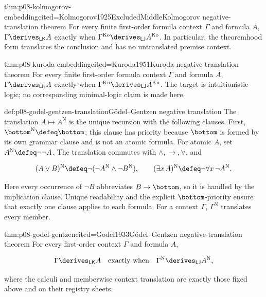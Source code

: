 \begin{hbtheorem}{thm:p08-kolmogorov-embedding}{cited=Kolmogorov1925ExcludedMiddle}{Kolmogorov negative-translation theorem}
For every finite first-order formula context \(\Gamma\) and formula \(A\),
\(\Gamma\derives_{\mathsf{LK}}A\) exactly when
\(\Gamma^{\mathrm{Ko}}\derives_{\mathsf{LJ}}A^{\mathrm{Ko}}\).
In particular, the theoremhood form translates the conclusion and has no
untranslated premise context.
\end{hbtheorem}

\begin{hbtheorem}{thm:p08-kuroda-embedding}{cited=Kuroda1951}{Kuroda negative-translation theorem}
For every finite first-order formula context \(\Gamma\) and formula \(A\),
\(\Gamma\derives_{\mathsf{LK}}A\) exactly when
\(\Gamma^{\mathrm{Ku}}\derives_{\mathsf{LJ}}A^{\mathrm{Ku}}\).
The target is intuitionistic logic; no corresponding minimal-logic claim is
made here.
\end{hbtheorem}

\begin{hbdefinition}{def:p08-godel-gentzen-translation}{G\"odel--Gentzen negative translation}
The translation \(A\mapsto A^{\mathrm N}\) is the unique recursion with the
following clauses.  First,
\(\bottom^{\mathrm N}\defeq\bottom\); this clause has priority because
\(\bottom\) is formed by its own grammar clause and is not an atomic formula.
For atomic \(A\), set \(A^{\mathrm N}\defeq\neg\neg A\).  The translation
commutes with \(\land,\to,\forall\), and

\[
 (A\lor B)^{\mathrm N}\defeq
   \neg(\neg A^{\mathrm N}\land\neg B^{\mathrm N}),
 \qquad
 (\exists x\,A)^{\mathrm N}\defeq
   \neg\forall x\,\neg A^{\mathrm N}.
\]

Here every occurrence of \(\neg B\) abbreviates \(B\to\bottom\), so it is
handled by the implication clause.  Unique readability and the explicit
\(\bottom\)-priority ensure that exactly one clause applies to each formula.
For a context \(\Gamma\), \(\Gamma^{\mathrm N}\) translates every member.
\end{hbdefinition}

\begin{hbtheorem}{thm:p08-godel-gentzen}{cited=Godel1933}{G\"odel--Gentzen negative-translation theorem}
For every first-order context \(\Gamma\) and formula \(A\),

\[
  \Gamma\derives_{\mathsf{LK}}A
  \quad\text{exactly when}\quad
  \Gamma^{\mathrm N}\derives_{\mathsf{LJ}}A^{\mathrm N},
\]

where the calculi and memberwise context translation are exactly those fixed
above and on their registry sheets.
\end{hbtheorem}


